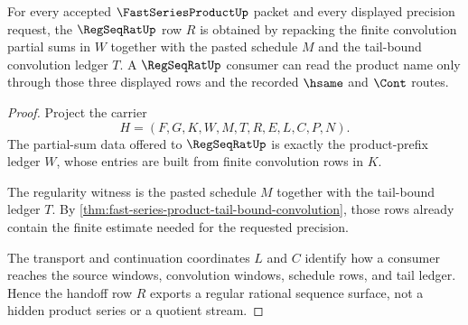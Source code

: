 \begin{theorem}
\label{thm:fast-series-product-regseqrat-handoff}
For every accepted $\FastSeriesProductUp$ packet and every displayed precision request, the $\RegSeqRatUp$ row $R$ is obtained by repacking the finite convolution partial sums in $W$ together with the pasted schedule $M$ and the tail-bound convolution ledger $T$. A $\RegSeqRatUp$ consumer can read the product name only through those three displayed rows and the recorded $\hsame$ and $\Cont$ routes.
\end{theorem}
\begin{proof}
Project the carrier
$$
H=(F,G,K,W,M,T,R,E,L,C,P,N).
$$
The partial-sum data offered to $\RegSeqRatUp$ is exactly the product-prefix ledger $W$, whose entries are built from finite convolution rows in $K$.

The regularity witness is the pasted schedule $M$ together with the tail-bound ledger $T$. By \autoref{thm:fast-series-product-tail-bound-convolution}, those rows already contain the finite estimate needed for the requested precision.

The transport and continuation coordinates $L$ and $C$ identify how a consumer reaches the source windows, convolution windows, schedule rows, and tail ledger. Hence the handoff row $R$ exports a regular rational sequence surface, not a hidden product series or a quotient stream.
\end{proof}

